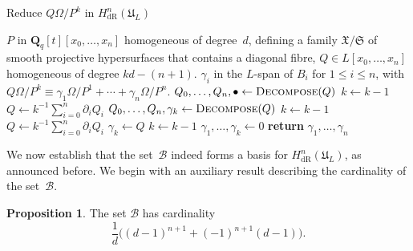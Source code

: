 \documentclass[a4paper,11pt]{article}
\numberwithin{equation}{section}
\newcommand{\QQ}{\mathbf{Q}} %
\providecommand{\HdR}{H_{\text{dR}}}    %
\providecommand{\cB}{\mathcal{B}} %
\theoremstyle{definition}
\newtheorem{prop}[thm]{Proposition}
\begin{document}
\begin{algorithm}
\caption{Reduce $Q \Omega / P^k$ in $\HdR^n(\mathfrak{U}_L)$}
\label{alg:PoleRed}
\begin{algorithmic}
\vspace{1mm}
\Require  $P$ in $\QQ_q[t][x_0, \dotsc, x_n]$ homogeneous of degree~$d$, 
         defining a family $\mathfrak{X}/\mathfrak{S}$ of smooth projective 
         hypersurfaces that contains a diagonal fibre, $Q \in L[x_0, \dotsc, x_n]$ 
         homogeneous of degree $kd - (n+1)$.
\Ensure  $\gamma_i$ in the $L$-span of $B_i$ for $1 \leq i \leq n$, with  
         $Q \Omega / P^k \equiv \gamma_{1} \Omega / P^{1} + \dotsb + \gamma_n \Omega / P^n$.
\State $Q_0, \dotsc, Q_n, \bullet \gets \Call{Decompose}{Q}$
\State $k \gets k-1$
\State $Q \gets k^{-1} \sum_{i=0}^n \partial_i Q_i$
\EndWhile
{}
\State $Q_0, \dotsc, Q_n, \gamma_k \gets \Call{Decompose}{Q}$
\State $k \gets k-1$
\State $Q \gets k^{-1} \sum_{i=0}^n \partial_i Q_i$
\EndWhile
{}
\State $\gamma_{k} \gets Q$
\State $k \gets k-1$
\EndIf
\State $\gamma_{1}, \dotsc, \gamma_{k} \gets 0$
\State \textbf{return} $\gamma_{1}, \dotsc, \gamma_n$
\EndProcedure
\end{algorithmic}
\end{algorithm}

We now establish that the set~$\cB$ indeed forms a basis for 
$\HdR^n(\mathfrak{U}_L)$, as announced before.  We begin with an 
auxiliary result describing the cardinality of the set~$\cB$.

\begin{prop} \label{prop:BasisSize}
The set $\cB$ has cardinality
\begin{equation*}
\frac{1}{d} \bigl((d-1)^{n+1} + (-1)^{n+1}(d-1) \bigr).
\end{equation*}
\end{prop}
\end{document}
